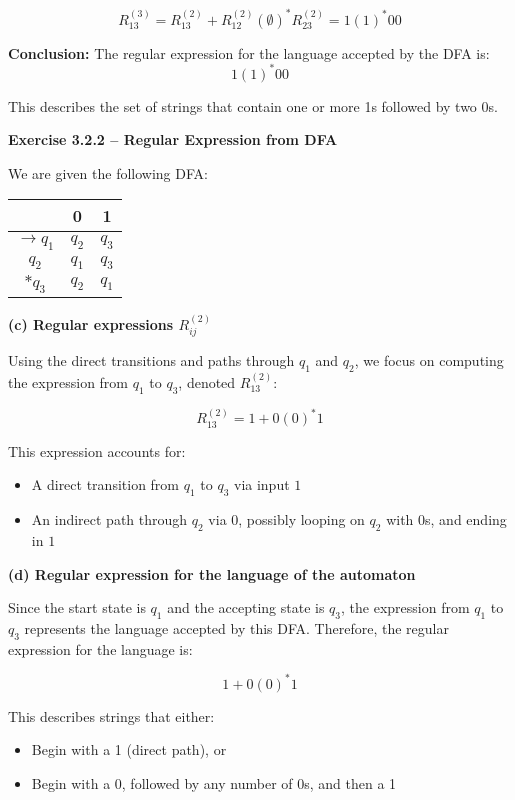 \documentclass{article}
\theoremstyle{theorem}
\theoremstyle{definition}
\theoremstyle{remark}
\begin{document}
\[
R_{13}^{(3)} = R_{13}^{(2)} + R_{12}^{(2)} (\emptyset)^* R_{23}^{(2)} = 1(1)^*00
\]

\textbf{Conclusion:} The regular expression for the language accepted by the DFA is:
\[
\boxed{1(1)^*00}
\]

This describes the set of strings that contain one or more 1s followed by two 0s.

\textbf{Exercise 3.2.2 – Regular Expression from DFA}

We are given the following DFA:

\begin{center}
\begin{tabular}{c|cc}
      & 0   & 1   \\
\hline
$\rightarrow q_1$ & $q_2$ & $q_3$ \\
$q_2$             & $q_1$ & $q_3$ \\
$*q_3$            & $q_2$ & $q_1$ \\
\end{tabular}
\end{center}

\textbf{(c) Regular expressions $R_{ij}^{(2)}$}

Using the direct transitions and paths through $q_1$ and $q_2$, we focus on computing the expression from $q_1$ to $q_3$, denoted $R_{13}^{(2)}$:

\[
R_{13}^{(2)} = 1 + 0(0)^*1
\]

This expression accounts for:
\begin{itemize}
    \item A direct transition from $q_1$ to $q_3$ via input $1$
    \item An indirect path through $q_2$ via $0$, possibly looping on $q_2$ with $0$s, and ending in $1$
\end{itemize}

\textbf{(d) Regular expression for the language of the automaton}

Since the start state is $q_1$ and the accepting state is $q_3$, the expression from $q_1$ to $q_3$ represents the language accepted by this DFA. Therefore, the regular expression for the language is:

\[
\boxed{1 + 0(0)^*1}
\]

This describes strings that either:
\begin{itemize}
    \item Begin with a 1 (direct path), or
    \item Begin with a 0, followed by any number of 0s, and then a 1
\end{itemize}
\end{document}
